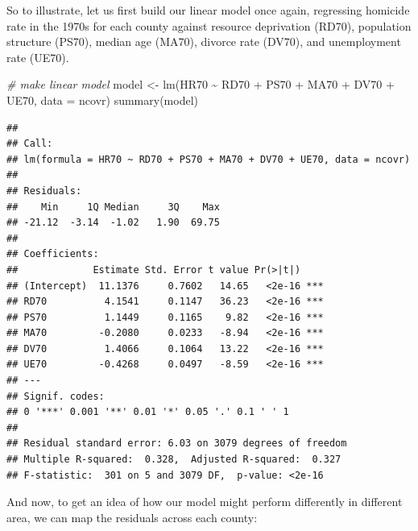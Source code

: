 \documentclass[
  krantz2]{krantz}
\makeatletter
\newenvironment{Shaded}{\begin{snugshade}}{\end{snugshade}}
\newcommand{\AttributeTok}[1]{\textcolor[rgb]{0.61,0.61,0.61}{#1}}
\newcommand{\CommentTok}[1]{\textcolor[rgb]{0.37,0.37,0.37}{\textit{#1}}}
\newcommand{\FunctionTok}[1]{\textcolor[rgb]{0,0,0}{#1}}
\newcommand{\NormalTok}[1]{#1}
\newcommand{\OtherTok}[1]{\textcolor[rgb]{0.37,0.37,0.37}{#1}}
\newcommand{\SpecialCharTok}[1]{\textcolor[rgb]{0,0,0}{#1}}
\newcommand{\StringTok}[1]{\textcolor[rgb]{0.5,0.5,0.5}{#1}}
\newenvironment{kframe}{%
\medskip{}
\setlength{\fboxsep}{.8em}
 \def\at@end@of@kframe{}%
 \ifinner\ifhmode%
  \def\at@end@of@kframe{\end{minipage}}%
  \begin{minipage}{\columnwidth}%
 \fi\fi%
 \def\FrameCommand##1{\hskip\@totalleftmargin \hskip-\fboxsep
 \colorbox{shadecolor}{##1}\hskip-\fboxsep
     \hskip-\linewidth \hskip-\@totalleftmargin \hskip\columnwidth}%
 \MakeFramed {\advance\hsize-\width
   \@totalleftmargin\z@ \linewidth\hsize
   \@setminipage}}%
 {\par\unskip\endMakeFramed%
 \at@end@of@kframe}
\renewenvironment{Shaded}{\begin{kframe}}{\end{kframe}}
\makeatother
\begin{document}
So to illustrate, let us first build our linear model once again, regressing homicide rate in the 1970s for each county against resource deprivation (RD70), population structure (PS70), median age (MA70), divorce rate (DV70), and unemployment rate (UE70).

\begin{Shaded}
\begin{Highlighting}[]
\CommentTok{\# make linear model}
\NormalTok{model }\OtherTok{\textless{}{-}} \FunctionTok{lm}\NormalTok{(HR70 }\SpecialCharTok{\textasciitilde{}}\NormalTok{ RD70 }\SpecialCharTok{+}\NormalTok{ PS70 }\SpecialCharTok{+}\NormalTok{ MA70 }\SpecialCharTok{+}\NormalTok{ DV70 }\SpecialCharTok{+}\NormalTok{ UE70, }\AttributeTok{data =}\NormalTok{ ncovr)}
\FunctionTok{summary}\NormalTok{(model)}
\end{Highlighting}
\end{Shaded}

\begin{verbatim}
## 
## Call:
## lm(formula = HR70 ~ RD70 + PS70 + MA70 + DV70 + UE70, data = ncovr)
## 
## Residuals:
##    Min     1Q Median     3Q    Max 
## -21.12  -3.14  -1.02   1.90  69.75 
## 
## Coefficients:
##             Estimate Std. Error t value Pr(>|t|)    
## (Intercept)  11.1376     0.7602   14.65   <2e-16 ***
## RD70          4.1541     0.1147   36.23   <2e-16 ***
## PS70          1.1449     0.1165    9.82   <2e-16 ***
## MA70         -0.2080     0.0233   -8.94   <2e-16 ***
## DV70          1.4066     0.1064   13.22   <2e-16 ***
## UE70         -0.4268     0.0497   -8.59   <2e-16 ***
## ---
## Signif. codes:  
## 0 '***' 0.001 '**' 0.01 '*' 0.05 '.' 0.1 ' ' 1
## 
## Residual standard error: 6.03 on 3079 degrees of freedom
## Multiple R-squared:  0.328,  Adjusted R-squared:  0.327 
## F-statistic:  301 on 5 and 3079 DF,  p-value: <2e-16
\end{verbatim}

And now, to get an idea of how our model might perform differently in different area, we can map the residuals across each county:

\begin{Shaded}
\end{Shaded}
\end{document}
